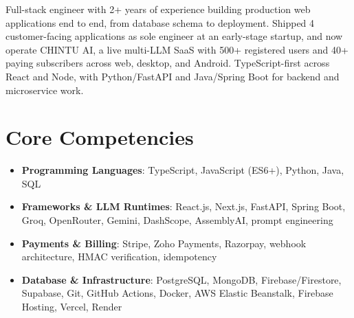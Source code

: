 \documentclass[11pt,a4paper,sans]{moderncv}
\begin{document}
\makecvtitle


\vspace{6pt}
\small{Full-stack engineer with 2+ years of experience building production web applications end to end, from database schema to deployment. Shipped 4 customer-facing applications as sole engineer at an early-stage startup, and now operate CHINTU AI, a live multi-LLM SaaS with 500+ registered users and 40+ paying subscribers across web, desktop, and Android. TypeScript-first across React and Node, with Python/FastAPI and Java/Spring Boot for backend and microservice work.}


\section{Core Competencies}
\vspace{1pt}
\begin{itemize}

\item \textbf{Programming Languages}: TypeScript, JavaScript (ES6+), Python, Java, SQL

\item \textbf{Frameworks \& LLM Runtimes}: React.js, Next.js, FastAPI, Spring Boot, Groq, OpenRouter, Gemini, DashScope, AssemblyAI, prompt engineering

\item \textbf{Payments \& Billing}: Stripe, Zoho Payments, Razorpay, webhook architecture, HMAC verification, idempotency

\item \textbf{Database \& Infrastructure}: PostgreSQL, MongoDB, Firebase/Firestore, Supabase, Git, GitHub Actions, Docker, AWS Elastic Beanstalk, Firebase Hosting, Vercel, Render

\end{itemize}

\end{document}
